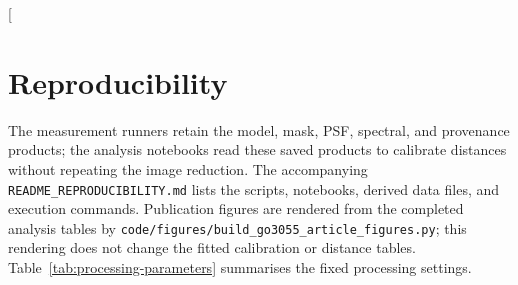 \documentclass[nodoi,nocopyright]{pas}
\begin{document}
\FloatBarrier
\twocolumn[{
\begin{minipage}{\textwidth}
\section{Reproducibility}
\label{app:reproducibility}

The measurement runners retain the model, mask, PSF, spectral, and provenance
products; the analysis notebooks read these saved products to calibrate
distances without repeating the image reduction. The accompanying
\nolinkurl{README_REPRODUCIBILITY.md} lists the scripts, notebooks, derived
data files, and execution commands. Publication figures are rendered from
the completed analysis tables by
\nolinkurl{code/figures/build_go3055_article_figures.py}; this rendering does not
change the fitted calibration or distance tables. Table~\ref{tab:processing-parameters}
summarises the fixed processing settings.


\end{minipage}}
\end{document}
